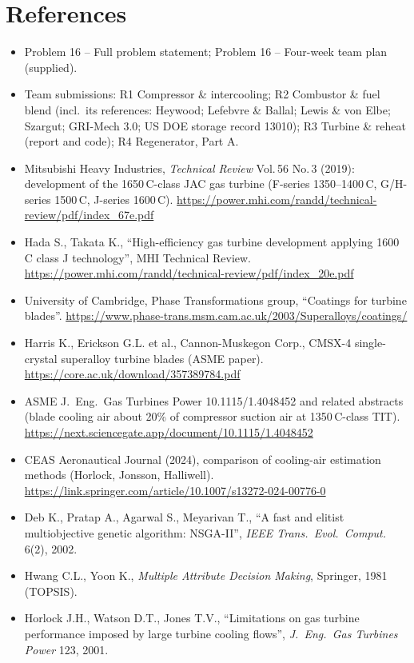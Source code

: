 \documentclass[10.5pt,a4paper]{article}
\begin{document}
\section*{References}
\small
\begin{itemize}[leftmargin=1.2em,itemsep=0pt]
\item[{[PS]}] Problem 16 -- Full problem statement; Problem 16 -- Four-week team plan (supplied).
\item[{[R1--R4]}] Team submissions: R1 Compressor \& intercooling; R2 Combustor \& fuel blend (incl.\ its references: Heywood; Lefebvre \& Ballal; Lewis \& von Elbe; Szargut; GRI-Mech 3.0; US DOE storage record 13010); R3 Turbine \& reheat (report and code); R4 Regenerator, Part A.
\item[{[W1]}] Mitsubishi Heavy Industries, \emph{Technical Review} Vol.\,56 No.\,3 (2019): development of the 1650\,\textdegree C-class JAC gas turbine (F-series 1350--1400\,\textdegree C, G/H-series 1500\,\textdegree C, J-series 1600\,\textdegree C). \url{https://power.mhi.com/randd/technical-review/pdf/index_67e.pdf}
\item[{[W2]}] Hada S., Takata K., ``High-efficiency gas turbine development applying 1600\,\textdegree C class J technology'', MHI Technical Review. \url{https://power.mhi.com/randd/technical-review/pdf/index_20e.pdf}
\item[{[W3]}] University of Cambridge, Phase Transformations group, ``Coatings for turbine blades''. \url{https://www.phase-trans.msm.cam.ac.uk/2003/Superalloys/coatings/}
\item[{[W4]}] Harris K., Erickson G.L. et al., Cannon-Muskegon Corp., CMSX-4 single-crystal superalloy turbine blades (ASME paper). \url{https://core.ac.uk/download/357389784.pdf}
\item[{[W5]}] ASME J.\ Eng.\ Gas Turbines Power 10.1115/1.4048452 and related abstracts (blade cooling air about 20\% of compressor suction air at 1350\,\textdegree C-class TIT). \url{https://next.sciencegate.app/document/10.1115/1.4048452}
\item[{[W6]}] CEAS Aeronautical Journal (2024), comparison of cooling-air estimation methods (Horlock, Jonsson, Halliwell). \url{https://link.springer.com/article/10.1007/s13272-024-00776-0}
\item[{[Deb 2002]}] Deb K., Pratap A., Agarwal S., Meyarivan T., ``A fast and elitist multiobjective genetic algorithm: NSGA-II'', \emph{IEEE Trans.\ Evol.\ Comput.} 6(2), 2002.
\item[{[Hwang 1981]}] Hwang C.L., Yoon K., \emph{Multiple Attribute Decision Making}, Springer, 1981 (TOPSIS).
\item[{[Horlock]}] Horlock J.H., Watson D.T., Jones T.V., ``Limitations on gas turbine performance imposed by large turbine cooling flows'', \emph{J.\ Eng.\ Gas Turbines Power} 123, 2001.
\end{itemize}
\normalsize
\end{document}
